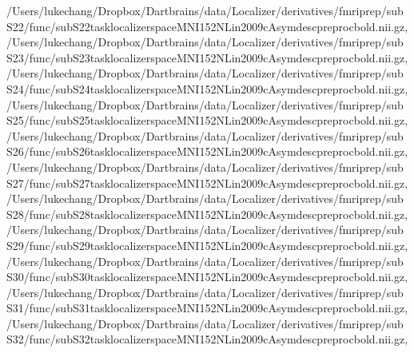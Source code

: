 \documentclass[letterpaper,10pt,english]{sphinxmanual}
\begin{document}
\begin{sphinxVerbatim}[commandchars=\\\{\}]
 \PYGZsq{}/Users/lukechang/Dropbox/Dartbrains/data/Localizer/derivatives/fmriprep/sub\PYGZhy{}S22/func/sub\PYGZhy{}S22\PYGZus{}task\PYGZhy{}localizer\PYGZus{}space\PYGZhy{}MNI152NLin2009cAsym\PYGZus{}desc\PYGZhy{}preproc\PYGZus{}bold.nii.gz\PYGZsq{},
 \PYGZsq{}/Users/lukechang/Dropbox/Dartbrains/data/Localizer/derivatives/fmriprep/sub\PYGZhy{}S23/func/sub\PYGZhy{}S23\PYGZus{}task\PYGZhy{}localizer\PYGZus{}space\PYGZhy{}MNI152NLin2009cAsym\PYGZus{}desc\PYGZhy{}preproc\PYGZus{}bold.nii.gz\PYGZsq{},
 \PYGZsq{}/Users/lukechang/Dropbox/Dartbrains/data/Localizer/derivatives/fmriprep/sub\PYGZhy{}S24/func/sub\PYGZhy{}S24\PYGZus{}task\PYGZhy{}localizer\PYGZus{}space\PYGZhy{}MNI152NLin2009cAsym\PYGZus{}desc\PYGZhy{}preproc\PYGZus{}bold.nii.gz\PYGZsq{},
 \PYGZsq{}/Users/lukechang/Dropbox/Dartbrains/data/Localizer/derivatives/fmriprep/sub\PYGZhy{}S25/func/sub\PYGZhy{}S25\PYGZus{}task\PYGZhy{}localizer\PYGZus{}space\PYGZhy{}MNI152NLin2009cAsym\PYGZus{}desc\PYGZhy{}preproc\PYGZus{}bold.nii.gz\PYGZsq{},
 \PYGZsq{}/Users/lukechang/Dropbox/Dartbrains/data/Localizer/derivatives/fmriprep/sub\PYGZhy{}S26/func/sub\PYGZhy{}S26\PYGZus{}task\PYGZhy{}localizer\PYGZus{}space\PYGZhy{}MNI152NLin2009cAsym\PYGZus{}desc\PYGZhy{}preproc\PYGZus{}bold.nii.gz\PYGZsq{},
 \PYGZsq{}/Users/lukechang/Dropbox/Dartbrains/data/Localizer/derivatives/fmriprep/sub\PYGZhy{}S27/func/sub\PYGZhy{}S27\PYGZus{}task\PYGZhy{}localizer\PYGZus{}space\PYGZhy{}MNI152NLin2009cAsym\PYGZus{}desc\PYGZhy{}preproc\PYGZus{}bold.nii.gz\PYGZsq{},
 \PYGZsq{}/Users/lukechang/Dropbox/Dartbrains/data/Localizer/derivatives/fmriprep/sub\PYGZhy{}S28/func/sub\PYGZhy{}S28\PYGZus{}task\PYGZhy{}localizer\PYGZus{}space\PYGZhy{}MNI152NLin2009cAsym\PYGZus{}desc\PYGZhy{}preproc\PYGZus{}bold.nii.gz\PYGZsq{},
 \PYGZsq{}/Users/lukechang/Dropbox/Dartbrains/data/Localizer/derivatives/fmriprep/sub\PYGZhy{}S29/func/sub\PYGZhy{}S29\PYGZus{}task\PYGZhy{}localizer\PYGZus{}space\PYGZhy{}MNI152NLin2009cAsym\PYGZus{}desc\PYGZhy{}preproc\PYGZus{}bold.nii.gz\PYGZsq{},
 \PYGZsq{}/Users/lukechang/Dropbox/Dartbrains/data/Localizer/derivatives/fmriprep/sub\PYGZhy{}S30/func/sub\PYGZhy{}S30\PYGZus{}task\PYGZhy{}localizer\PYGZus{}space\PYGZhy{}MNI152NLin2009cAsym\PYGZus{}desc\PYGZhy{}preproc\PYGZus{}bold.nii.gz\PYGZsq{},
 \PYGZsq{}/Users/lukechang/Dropbox/Dartbrains/data/Localizer/derivatives/fmriprep/sub\PYGZhy{}S31/func/sub\PYGZhy{}S31\PYGZus{}task\PYGZhy{}localizer\PYGZus{}space\PYGZhy{}MNI152NLin2009cAsym\PYGZus{}desc\PYGZhy{}preproc\PYGZus{}bold.nii.gz\PYGZsq{},
 \PYGZsq{}/Users/lukechang/Dropbox/Dartbrains/data/Localizer/derivatives/fmriprep/sub\PYGZhy{}S32/func/sub\PYGZhy{}S32\PYGZus{}task\PYGZhy{}localizer\PYGZus{}space\PYGZhy{}MNI152NLin2009cAsym\PYGZus{}desc\PYGZhy{}preproc\PYGZus{}bold.nii.gz\PYGZsq{},

\end{sphinxVerbatim}
\end{document}
